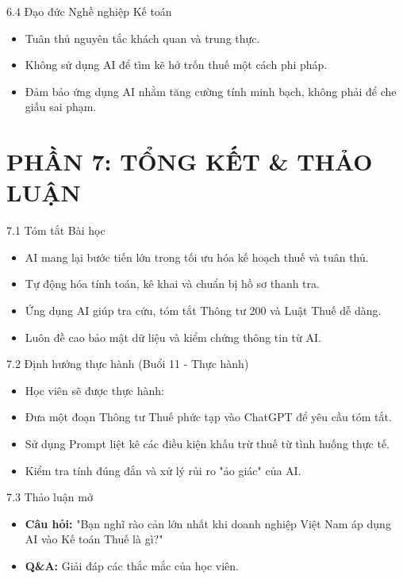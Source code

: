 \documentclass[aspectratio=169]{beamer}
\begin{document}
\begin{frame}{6.4 Đạo đức Nghề nghiệp Kế toán}
    \begin{itemize}
        \item Tuân thủ nguyên tắc khách quan và trung thực.
        \item Không sử dụng AI để tìm kẽ hở trốn thuế một cách phi pháp.
        \item Đảm bảo ứng dụng AI nhằm tăng cường tính minh bạch, không phải để che giấu sai phạm.
    \end{itemize}
\end{frame}


\section{PHẦN 7: TỔNG KẾT \& THẢO LUẬN}


\begin{frame}{7.1 Tóm tắt Bài học}
    \begin{itemize}
        \item AI mang lại bước tiến lớn trong tối ưu hóa kế hoạch thuế và tuân thủ.
        \item Tự động hóa tính toán, kê khai và chuẩn bị hồ sơ thanh tra.
        \item Ứng dụng AI giúp tra cứu, tóm tắt Thông tư 200 và Luật Thuế dễ dàng.
        \item Luôn đề cao bảo mật dữ liệu và kiểm chứng thông tin từ AI.
    \end{itemize}
\end{frame}


\begin{frame}{7.2 Định hướng thực hành (Buổi 11 - Thực hành)}
    \begin{itemize}
        \item Học viên sẽ được thực hành:
        \item Đưa một đoạn Thông tư Thuế phức tạp vào ChatGPT để yêu cầu tóm tắt.
        \item Sử dụng Prompt liệt kê các điều kiện khấu trừ thuế từ tình huống thực tế.
        \item Kiểm tra tính đúng đắn và xử lý rủi ro "ảo giác" của AI.
    \end{itemize}
\end{frame}


\begin{frame}{7.3 Thảo luận mở}
    \begin{itemize}
        \item \textbf{Câu hỏi:} "Bạn nghĩ rào cản lớn nhất khi doanh nghiệp Việt Nam áp dụng AI vào Kế toán Thuế là gì?"
        \item \textbf{Q\&A:} Giải đáp các thắc mắc của học viên.
    \end{itemize}
\end{frame}
\end{document}
